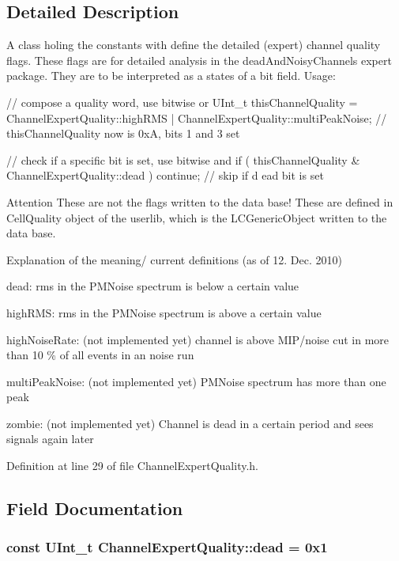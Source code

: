 \subsection{Detailed Description}
A class holing the constants with define the detailed (expert) channel quality flags. These flags are for detailed analysis in the deadAndNoisyChannels expert package. They are to be interpreted as a states of a bit field. Usage: 
\begin{DoxyCode}
  // compose a quality word, use bitwise or
  UInt_t thisChannelQuality = ChannelExpertQuality::highRMS | 
      ChannelExpertQuality::multiPeakNoise;
  // thisChannelQuality now is 0xA, bits 1 and 3 set
  
  // check if a specific bit is set, use bitwise and
  if ( thisChannelQuality & ChannelExpertQuality::dead ) {continue;} // skip if d
      ead bit is set
\end{DoxyCode}


\begin{DoxyAttention}{Attention}
These are not the flags written to the data base! These are defined in CellQuality object of the userlib, which is the LCGenericObject written to the data base.
\end{DoxyAttention}
Explanation of the meaning/ current definitions (as of 12. Dec. 2010) \begin{DoxyItemize}
\item {\ttfamily dead:} rms in the PMNoise spectrum is below a certain value \item {\ttfamily highRMS:} rms in the PMNoise spectrum is above a certain value \item {\ttfamily highNoiseRate:} (not implemented yet) channel is above MIP/noise cut in more than 10 \% of all events in an noise run \item {\ttfamily multiPeakNoise:} (not implemented yet) PMNoise spectrum has more than one peak \item {\ttfamily zombie:} (not implemented yet) Channel is dead in a certain period and sees signals again later \end{DoxyItemize}


Definition at line 29 of file ChannelExpertQuality.h.

\subsection{Field Documentation}
\hypertarget{class_channel_expert_quality_aabde82530d3975d698fbff3e33d7972c}{
\subsubsection[{dead}]{\setlength{\rightskip}{0pt plus 5cm}const UInt\_\-t {\bf ChannelExpertQuality::dead} = 0x1}}
\label{class_channel_expert_quality_aabde82530d3975d698fbff3e33d7972c}


